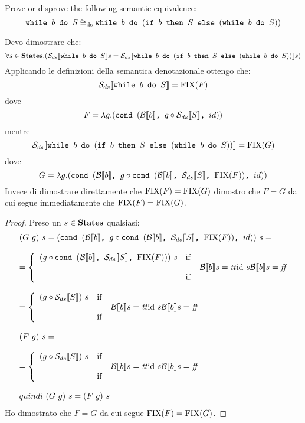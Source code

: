 {Prove or disprove the following semantic equivalence:
$$
\wbS{b}{S} \eqDS \wbS{b}{(\ifABC{b}{S}{(\wbS{b}{S})})}
$$	
}
{
Devo dimostrare che:
$$
\forall s \in \states.(\dsCtxt{\wbS{b}{S}} s = \dsCtxt{\wbS{b}{(\ifABC{b}{S}{(\wbS{b}{S})})}} s)
$$	
Applicando le definizioni della semantica denotazionale ottengo che:
$$
\dsCtxt{\wbS{b}{S}} = \fixp{F}
$$
dove 
$$
F = \lambda g. (\cond{b}{g \circ \dsCtxt{S}}{id})
$$
mentre
$$
\dsCtxt{\wbS{b}{(\ifABC{b}{S}{(\wbS{b}{S})})}} = \fixp{G}
$$
dove
$$
G = \lambda g .(\cond{b}{g \circ \cond{b}{\dsCtxt{S}}{\fixp{F}}}{id})
$$
Invece di dimostrare direttamente che $\fixp{F} = \fixp{G}$ dimostro 
che $F = G$ da cui segue immediatamente che $\fixp{F} = \fixp{G}$.

\begin{proof}
Preso un $s \in \states$ qualsiasi:
$$
\begin{array}{l}
(G\ g)\ s =
(\cond{b}{g \circ \cond{b}{\dsCtxt{S}}{\fixp{F}}}{id})\ s =\\
\\
= \caseFun{(g \circ \cond{b}{\dsCtxt{S}}{\fixp{F}})\ s}
          {\B{b} =\semtrue}
          {\idDS\ s}
          {\B{b} = \semfalse} \\
\\
= \caseFun{(g \circ \dsCtxt{S})\ s}
          {\B{b} = \semtrue}
          {\idDS\ s}
          {\B{b} = \semfalse} \\
\\ 
(F\ g)\ s = \\
\\
= \caseFun{(g \circ \dsCtxt{S})\ s}
          {\B{b} = \semtrue}
          {\idDS\ s}
          {\B{b} = \semfalse} \\
\\
quindi\ (G\ g)\ s = (F\ g)\ s
\end{array}
$$ 
Ho dimostrato che $F = G$ da cui segue $\fixp{F} = \fixp{G}$.
\end{proof}
	
}
